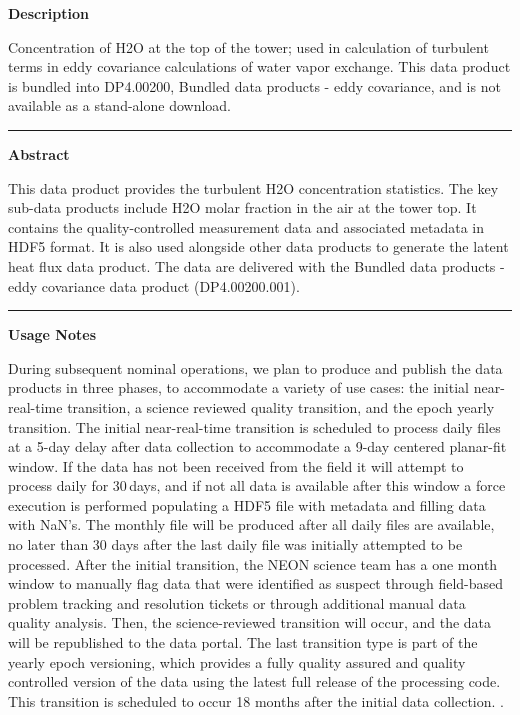 \documentclass[]{article}
\begin{document}
\textbf{Description}

Concentration of H2O at the top of the tower; used in calculation of
turbulent terms in eddy covariance calculations of water vapor exchange.
This data product is bundled into DP4.00200, Bundled data products -
eddy covariance, and is not available as a stand-alone download.

\begin{center}\rule{0.5\linewidth}{\linethickness}\end{center}

\textbf{Abstract}

This data product provides the turbulent H2O concentration statistics.
The key sub-data products include H2O molar fraction in the air at the
tower top. It contains the quality-controlled measurement data and
associated metadata in HDF5 format. It is also used alongside other data
products to generate the latent heat flux data product. The data are
delivered with the Bundled data products - eddy covariance data product
(DP4.00200.001).

\begin{center}\rule{0.5\linewidth}{\linethickness}\end{center}

\textbf{Usage Notes}

During subsequent nominal operations, we plan to produce and publish the
data products in three phases, to accommodate a variety of use cases:
the initial near-real-time transition, a science reviewed quality
transition, and the epoch yearly transition. The initial near-real-time
transition is scheduled to process daily files at a 5-day delay after
data collection to accommodate a 9-day centered planar-fit window. If
the data has not been received from the field it will attempt to process
daily for 30\,days, and if not all data is available after this window a
force execution is performed populating a HDF5 file with metadata and
filling data with NaN's. The monthly file will be produced after all
daily files are available, no later than 30 days after the last daily
file was initially attempted to be processed. After the initial
transition, the NEON science team has a one month window to manually
flag data that were identified as suspect through field-based problem
tracking and resolution tickets or through additional manual data
quality analysis. Then, the science-reviewed transition will occur, and
the data will be republished to the data portal. The last transition
type is part of the yearly epoch versioning, which provides a fully
quality assured and quality controlled version of the data using the
latest full release of the processing code. This transition is scheduled
to occur 18 months after the initial data collection. \newpage
.
\end{document}
